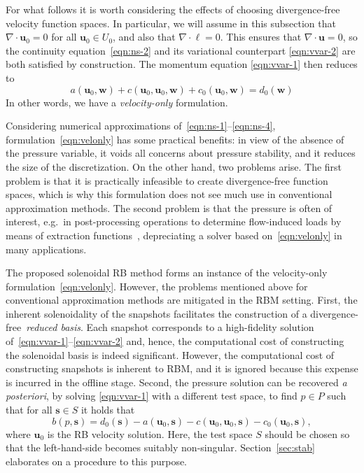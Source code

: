 \documentclass[onecolumn, twoside, a4paper, 11pt]{article}
\begin{document}
For what follows it is worth considering the effects of choosing divergence-free
velocity function spaces. In particular, we will assume in this subsection that
$\nabla \cdot \bm{u}_0 = 0$ for all $\bm{u}_0 \in U_0$, and also that
$\nabla \cdot \bm \ell = 0$. This ensures that $\nabla \cdot \bm u = 0$, so the
continuity equation~\eqref{eqn:ns-2} and its variational counterpart
\eqref{eqn:vvar-2} are both satisfied by construction. The momentum equation
\eqref{eqn:vvar-1} then reduces to
%
\begin{equation}
a(\bm u_0, \bm w) + c(\bm u_0, \bm u_0, \bm w) + c_0(\bm u_0, \bm w)
= d_0(\bm w)
\label{eqn:velonly}
\end{equation}
%
In other words, we have a \emph{velocity-only} formulation.

Considering numerical approximations of~\eqref{eqn:ns-1}--\eqref{eqn:ns-4},
formulation~\eqref{eqn:velonly} has some practical benefits: in view of the
absence of the pressure variable, it voids all concerns about
pressure stability, and it reduces the size of the discretization.
On the other hand, two problems arise. The first problem is that it is
practically infeasible to create divergence-free function spaces, which is
why this formulation does not see much use in conventional approximation methods.
The second problem is that the pressure
is often of interest, e.g.~in post-processing operations to determine flow-induced loads by means
of extraction functions~\cite{Melbo2003goe,Brummelen2012fep}, depreciating a solver
based on~\eqref{eqn:velonly} in many applications.

The proposed solenoidal RB method forms an instance of the velocity-only formulation~\eqref{eqn:velonly}.
However, the problems mentioned above for conventional approximation methods are mitigated in the
RBM setting. First, the inherent solenoidality of the snapshots facilitates the construction of a
divergence-free~\emph{reduced basis}. Each snapshot corresponds to a high-fidelity solution
of~\eqref{eqn:vvar-1}--\eqref{eqn:vvar-2} and, hence, the computational cost of constructing the
solenoidal basis is indeed significant. However, the computational cost of constructing snapshots is
inherent to RBM, and it is ignored because this expense is incurred in the offline stage.  Second,
the pressure solution can be recovered \emph{a posteriori}, by solving \eqref{eqn:vvar-1} with a
different test space, to find $p\in P$ such that for all $\bm s \in S$ it holds that
%
\begin{equation}
  b(p, \bm s) = d_0(\bm s) - a(\bm u_0, \bm s) - c(\bm u_0, \bm u_0, \bm s) - c_0(\bm u_0, \bm s),
  \label{eqn:sup-vvar}
\end{equation}
where $\bm u_0$ is the RB velocity solution. Here, the test space $S$ should
be chosen so that the left-hand-side becomes suitably non-singular.
Section~\ref{sec:stab} elaborates on a procedure to this purpose.
\end{document}
